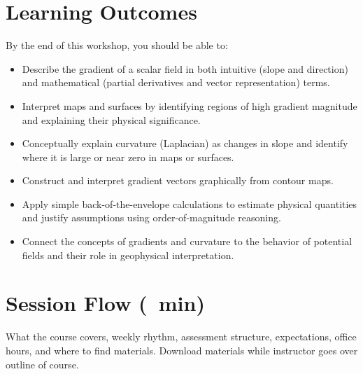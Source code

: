 \section*{Learning Outcomes}

By the end of this workshop, you should be able to:
\begin{itemize}
  \item Describe the gradient of a scalar field in both intuitive (slope and direction) and mathematical (partial derivatives and vector representation) terms.
  \item Interpret maps and surfaces by identifying regions of high gradient magnitude and explaining their physical significance.
  \item Conceptually explain curvature (Laplacian) as changes in slope and identify where it is large or near zero in maps or surfaces.
  \item Construct and interpret gradient vectors graphically from contour maps.
  \item Apply simple back-of-the-envelope calculations to estimate physical quantities and justify assumptions using order-of-magnitude reasoning.
  \item Connect the concepts of gradients and curvature to the behavior of potential fields and their role in geophysical interpretation.
\end{itemize}

\section*{Session Flow (\timelinelength\ min)}


What the course covers, weekly rhythm, assessment structure, expectations, office hours, and where to find materials.  Download materials while instructor goes over outline of course.




